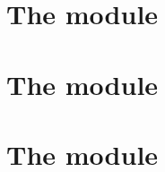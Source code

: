 

\chapter{The \shakiraMod{} module}   \label{chap: shakira data}        \minitoc 
\chapter{The \blkMdxMod{} module}    \label{chap: blake modexp data}   \minitoc 
\chapter{The \ecDataMod{} module}    \label{chap: ec data}             \minitoc 
